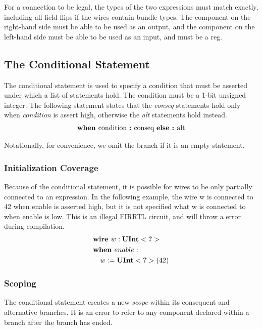 \documentclass[12pt]{article}
\begin{document}
For a connection to be legal, the types of the two expressions must match exactly, including all field flips if the wires contain bundle types.
The component on the right-hand side must be able to be used as an output, and the component on the left-hand side must be able to be used as an input, and must be a reg.

\subsection{The Conditional Statement}
The conditional statement is used to specify a condition that must be asserted under which a list of statements hold.
The condition must be a 1-bit unsigned integer.
The following statement states that the {\em conseq} statements hold only when {\em condition} is assert high, otherwise the {\em alt} statements hold instead.
\[
\begin{aligned}
\text{\bf when\ } \text{condition } \text{\bf :\ } \text{conseq } \text{\bf else :\ } \text{alt}
\end{aligned}
\]

Notationally, for convenience, we omit the  branch if it is an empty statement. 

\subsubsection{Initialization Coverage}
Because of the conditional statement, it is possible for wires to be only partially connected to an expression.
In the following example, the wire w is connected to 42 when enable is asserted high, but it is not specified what w is connected to when enable is low.
This is an illegal FIRRTL circuit, and will throw a  error during compilation.
\[
\begin{aligned}
&\text{\bf wire\ } w : \text{\bf UInt}<\text{\bf ?}> \\
&\text{\bf when\ } enable : \\
&\quad w := \text{\bf UInt}<\text{\bf ?}>(42) \\
\end{aligned}
\]

\subsubsection{Scoping}
The conditional statement creates a new {\em scope} within its consequent and alternative branches.
It is an error to refer to any component declared within a branch after the branch has ended.
\end{document}
